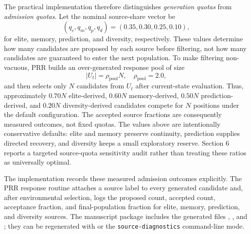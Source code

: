 \documentclass[1p,times]{elsarticle}
\begin{document}
The practical implementation therefore distinguishes \emph{generation quotas} from \emph{admission quotas}. Let the nominal source-share vector be
\begin{equation}
(q_e,q_m,q_p,q_d)=(0.35,0.30,0.25,0.10),
\end{equation}
for elite, memory, prediction, and diversity, respectively. These values determine how many candidates are proposed by each source before filtering, not how many candidates are guaranteed to enter the next population. To make filtering non-vacuous, PRR builds an over-generated response pool of size
\begin{equation}
|U_t|=\rho_{\mathrm{pool}} N,\quad \rho_{\mathrm{pool}}=2.0,
\end{equation}
and then selects only $N$ candidates from $U_t$ after current-state evaluation. Thus, approximately $0.70N$ elite-derived, $0.60N$ memory-derived, $0.50N$ prediction-derived, and $0.20N$ diversity-derived candidates compete for $N$ positions under the default configuration. The accepted source fractions are consequently measured outcomes, not fixed quotas. The values above are intentionally conservative defaults: elite and memory preserve continuity, prediction supplies directed recovery, and diversity keeps a small exploratory reserve. Section 6 reports a targeted source-quota sensitivity audit rather than treating these ratios as universally optimal.

The implementation records these measured admission outcomes explicitly. The PRR response routine attaches a source label to every generated candidate and, after environmental selection, logs the proposed count, accepted count, acceptance fraction, and final-population fraction for elite, memory, prediction, and diversity sources. The manuscript package includes the generated files , , and ; they can be regenerated with  or the \texttt{source-diagnostics} command-line mode.
\end{document}

